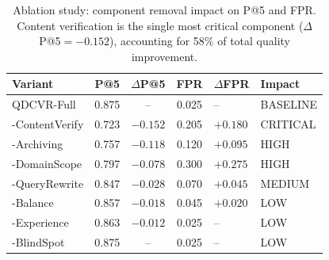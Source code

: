 \begin{table}[t]
\centering
\caption{Ablation study: component removal impact on P@5 and FPR. Content verification is the single most critical component ($\Delta$P@5$=-0.152$), accounting for 58\% of total quality improvement.}
\label{tab:ablation}
\begin{tabular}{lcccl}
\toprule
\textbf{Variant} & \textbf{P@5} & \textbf{$\Delta$P@5} & \textbf{FPR} & \textbf{$\Delta$FPR} & \textbf{Impact} \\
\midrule
    QDCVR-Full           & 0.875 & -- & 0.025 & -- & BASELINE \\
    -ContentVerify       & 0.723 & $-0.152$ & 0.205 & $+0.180$ & CRITICAL \\
    -Archiving           & 0.757 & $-0.118$ & 0.120 & $+0.095$ & HIGH \\
    -DomainScope         & 0.797 & $-0.078$ & 0.300 & $+0.275$ & HIGH \\
    -QueryRewrite        & 0.847 & $-0.028$ & 0.070 & $+0.045$ & MEDIUM \\
    -Balance             & 0.857 & $-0.018$ & 0.045 & $+0.020$ & LOW \\
    -Experience          & 0.863 & $-0.012$ & 0.025 & -- & LOW \\
    -BlindSpot           & 0.875 & -- & 0.025 & -- & LOW \\
\bottomrule
\end{tabular}
\end{table}
